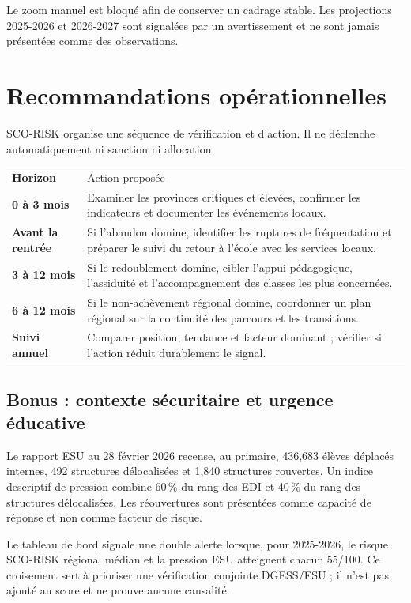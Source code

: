 \documentclass[12pt,a4paper]{article}
\begin{document}
Le zoom manuel est bloqué afin de conserver un cadrage stable. Les projections 2025-2026 et 2026-2027 sont signalées par un avertissement et ne sont jamais présentées comme des observations.
\clearpage
\thispagestyle{fancy}

\section{Recommandations opérationnelles}
SCO-RISK organise une séquence de vérification et d'action. Il ne déclenche automatiquement ni sanction ni allocation.

\begin{tabularx}{\textwidth}{>{\bfseries}p{3.4cm} X}
\rowcolor{Navy}\color{white}Horizon & \color{white}Action proposée\\
0 à 3 mois & Examiner les provinces critiques et élevées, confirmer les indicateurs et documenter les événements locaux.\\
Avant la rentrée & Si l'abandon domine, identifier les ruptures de fréquentation et préparer le suivi du retour à l'école avec les services locaux.\\
3 à 12 mois & Si le redoublement domine, cibler l'appui pédagogique, l'assiduité et l'accompagnement des classes les plus concernées.\\
6 à 12 mois & Si le non-achèvement régional domine, coordonner un plan régional sur la continuité des parcours et les transitions.\\
Suivi annuel & Comparer position, tendance et facteur dominant ; vérifier si l'action réduit durablement le signal.\\
\end{tabularx}

\subsection{Bonus : contexte sécuritaire et urgence éducative}
Le rapport ESU au 28 février 2026 recense, au primaire, 436,683 élèves déplacés internes, 492 structures délocalisées et 1,840 structures rouvertes. Un indice descriptif de pression combine 60\,\% du rang des EDI et 40\,\% du rang des structures délocalisées. Les réouvertures sont présentées comme capacité de réponse et non comme facteur de risque.

Le tableau de bord signale une \og double alerte \fg{} lorsque, pour 2025-2026, le risque SCO-RISK régional médian et la pression ESU atteignent chacun 55/100. Ce croisement sert à prioriser une vérification conjointe DGESS/ESU ; il n'est pas ajouté au score et ne prouve aucune causalité.
\end{document}
